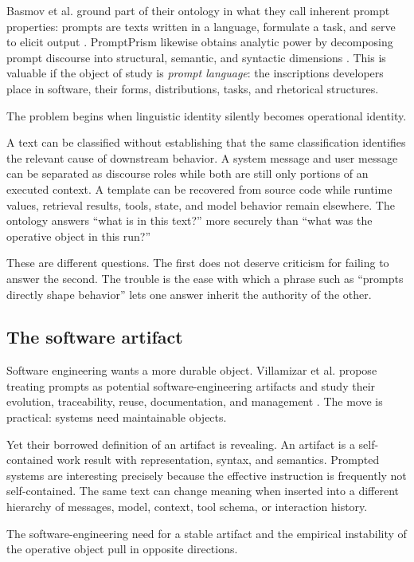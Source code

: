 \documentclass[11pt]{article}
\begin{document}
Basmov et al. ground part of their ontology in what they call inherent prompt properties: prompts are texts written in a language, formulate a task, and serve to elicit output \citep{Basmov2026PromptsWild}. PromptPrism likewise obtains analytic power by decomposing prompt discourse into structural, semantic, and syntactic dimensions \citep{Jeoung2026PromptPrism}. This is valuable if the object of study is \emph{prompt language}: the inscriptions developers place in software, their forms, distributions, tasks, and rhetorical structures.

The problem begins when linguistic identity silently becomes operational identity.

A text can be classified without establishing that the same classification identifies the relevant cause of downstream behavior. A system message and user message can be separated as discourse roles while both are still only portions of an executed context. A template can be recovered from source code while runtime values, retrieval results, tools, state, and model behavior remain elsewhere. The ontology answers ``what is in this text?'' more securely than ``what was the operative object in this run?''

These are different questions. The first does not deserve criticism for failing to answer the second. The trouble is the ease with which a phrase such as ``prompts directly shape behavior'' lets one answer inherit the authority of the other.

\subsection{The software artifact}

Software engineering wants a more durable object. Villamizar et al. propose treating prompts as potential software-engineering artifacts and study their evolution, traceability, reuse, documentation, and management \citep{Villamizar2025PromptsArtifacts}. The move is practical: systems need maintainable objects.

Yet their borrowed definition of an artifact is revealing. An artifact is a self-contained work result with representation, syntax, and semantics. Prompted systems are interesting precisely because the effective instruction is frequently not self-contained. The same text can change meaning when inserted into a different hierarchy of messages, model, context, tool schema, or interaction history.

The software-engineering need for a stable artifact and the empirical instability of the operative object pull in opposite directions.
\end{document}
